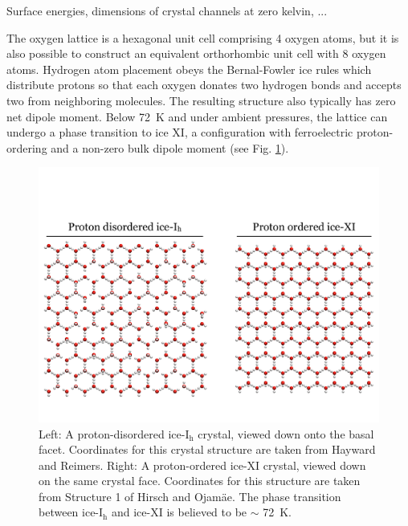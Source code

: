 Surface energies, dimensions of crystal channels at zero kelvin, ...

The oxygen lattice is a hexagonal unit cell comprising 4 oxygen atoms,
but it is also possible to construct an equivalent orthorhombic unit
cell with 8 oxygen atoms.\cite{Hirsch2004} Hydrogen atom placement
obeys the Bernal-Fowler ice rules which distribute protons so that
each oxygen donates two hydrogen bonds and accepts two from
neighboring molecules.\cite{Bernal1933} The resulting structure also
typically has zero net dipole moment. Below 72~K and under ambient
pressures, the lattice can undergo a phase transition to ice XI, a
configuration with ferroelectric proton-ordering and a non-zero bulk
dipole moment (see Fig. \ref{fig:iceTransition}).

\begin{figure}
\includegraphics[width=\linewidth]{Figures/iceTransition}
\caption{\label{fig:iceTransition}Left: A proton-disordered
  ice-I$_\mathrm{h}$ crystal, viewed down onto the basal
  facet. Coordinates for this crystal structure are taken from
  Hayward and Reimers.\cite{Hayward1997} Right:
  A proton-ordered ice-XI crystal, viewed down on the same crystal
  face. Coordinates for this structure are taken from Structure 1 of
  Hirsch and Ojam\"{a}e.\cite{Hirsch2004} The phase transition between
ice-I$_\mathrm{h}$ and ice-XI is believed to be $\sim$ 72~K.}
\end{figure}

